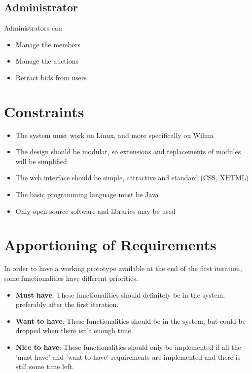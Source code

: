 	\subsection{Administrator}
		Administrators can
		\begin{itemize}
			\item Manage the members
			\item Manage the auctions
			\item Retract bids from users
		\end{itemize}
\section{Constraints}
\begin{itemize}
	\item The system must work on Linux, and more specifically on Wilma
	\item The design should be modular, so extensions and replacements of 
	modules will be simplified
	\item The web interface should be simple, attractive and standard
	(CSS, XHTML)
	\item The basic programming language must be Java
	\item Only open source software and libraries may be used
\end{itemize}
\section{Apportioning of Requirements}
	In order to have a working prototype available at the end of the
	first iteration, some functionalities have different priorities.
	\begin{itemize}
		\item \textbf{Must have}: These functionalities should definitely 
		be in the system, preferably after the first iteration.
		\item \textbf{Want to have}: These functionalities should be in 
		the system, but could be dropped when there isn't enough time.
		\item \textbf{Nice to have}: These functionalities should only be 
		implemented if all the 'must have' and 'want to have' 
		requirements are implemented and there is still some time left.
	\end{itemize}